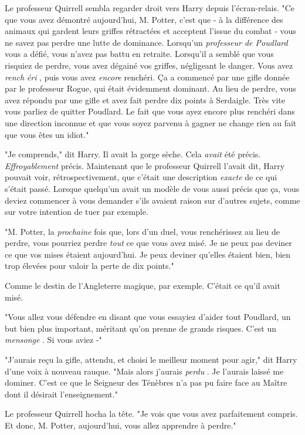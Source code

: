 Le professeur Quirrell sembla regarder droit vers Harry depuis l'écran-relais. "Ce que vous avez démontré aujourd'hui, M. Potter, c'est que - à la différence des animaux qui gardent leurs griffes rétractées et acceptent l'issue du combat - vous ne savez pas perdre une lutte de dominance. Lorsqu'un \emph{professeur de Poudlard}  vous a défié, vous n'avez pas battu en retraite. Lorsqu'il a semblé que vous risquiez de perdre, vous avez dégainé vos griffes, négligeant le danger. Vous avez \emph{rench} \emph{éri} , puis vous avez \emph{encore}  renchéri. Ça a commencé par une gifle donnée par le professeur Rogue, qui était évidemment dominant. Au lieu de perdre, vous avez répondu par une gifle et avez fait perdre dix points à Serdaigle. Très vite vous parliez de quitter Poudlard. Le fait que vous ayez encore plus renchéri dans une direction inconnue et que vous soyez parvenu à gagner ne change rien au fait que vous êtes un idiot."

"Je comprends," dit Harry. Il avait la gorge sèche. Cela \emph{avait}  été précis. \emph{Effroyablement}  précis. Maintenant que le professeur Quirrell l'avait dit, Harry pouvait voir, rétrospectivement, que c'était une description \emph{exacte}  de ce qui s'était passé. Lorsque quelqu'un avait un modèle de vous aussi précis que ça, vous deviez commencer à vous demander s'ils avaient raison sur d'autres sujets, comme sur votre intention de tuer par exemple.

"M. Potter, la \emph{prochaine}  fois que, lors d'un duel, vous renchérissez au lieu de perdre, vous pourriez perdre \emph{tout}  ce que vous avez misé. Je ne peux pas deviner ce que vos mises étaient aujourd'hui. Je peux deviner qu'elles étaient bien, bien trop élevées pour valoir la perte de dix points."

Comme le destin de l'Angleterre magique, par exemple. C'était ce qu'il avait misé.

"Vous allez vous défendre en disant que vous essayiez d'aider tout Poudlard, un but bien plus important, méritant qu'on prenne de grands risques. C'est un \emph{mensonge} . Si vous aviez -"

"J'aurais reçu la gifle, attendu, et choisi le meilleur moment pour agir," dit Harry d'une voix à nouveau rauque. "Mais alors j'aurais \emph{perdu} . Je l'aurais laissé me dominer. C'est ce que le Seigneur des Ténèbres n'a pas pu faire face au Maître dont il désirait l'enseignement."

Le professeur Quirrell hocha la tête. "Je vois que vous avez parfaitement compris. Et donc, M. Potter, aujourd'hui, vous allez apprendre à perdre."

